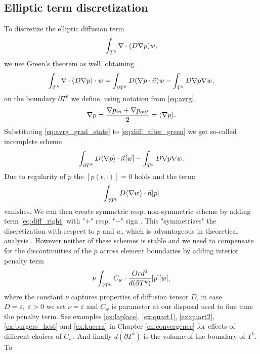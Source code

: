 \subsection{Elliptic term discretization}
\label{se:diff_term}
To discretize the elliptic diffusion term
$$
\int_{T^k}\nabla\cdot(D\nabla p) w,
$$
we use Green's theorem as well, obtaining
\begin{equation}
\label{eq:diff_after_green}
\int_{T^k}\nabla \cdot (D \nabla p)\cdot w  = \int_{\partial T^k} D(\nabla p\cdot\vec{n}) w - \int_{T^k} 
D\nabla p \nabla w,
\end{equation}
on the boundary $\partial T^k$ we define, using notation from \eqref{eq:avrg},
\begin{equation}
\nabla p = \frac{\nabla p_{in} + \nabla p_{out}}{2} = \langle\nabla p\rangle.
\label{eq:avrg_grad_state}
\end{equation}
Substituting \eqref{eq:avrg_grad_state} to \eqref{eq:diff_after_green} we get 
so-called incomplete scheme
\begin{equation}
\int_{\partial T^k} D \langle\nabla p\rangle \cdot \vec{n} [w] - \int_{T^k} D\nabla p 
\nabla w.
\end{equation}
Due to regularity of $p$ the $[p(t, \cdot)] = 0$ holds \cite[p. 14]{Kucera} and the term:
\begin{equation}
\label{eq:diff_right}
\int_{\partial T^k} D \langle\nabla w \rangle\cdot \vec{n} [p]
\end{equation}
vanishes.
We can then create symmetric resp. non-symmetric scheme by adding term 
\eqref{eq:diff_right} with "$+$" resp. "$-$" sign \cite[p. 14]{Kucera}. This 
"symmetrizes" the discretization with respect to $p$ and $w$, which is advantageous in 
theoretical analysis \cite[p. 39]{Dolejsi2015}.
However neither of these schemes is stable and we need to compensate for the 
discontinuities of the $p$ across element boundaries by adding interior penalty term 
\cite{Kucera, Antonietti2013, Dolejsi2015}
\begin{equation}
\nu \int_{\partial T^k} C_w \cdot \frac{Ord^2}{d(\partial T^k)} [p][w],
\end{equation}
where the constant $\nu$ captures properties of diffusion tensor $D$, in case $D = 
\varepsilon, \; \varepsilon > 0$ we set $\nu = \varepsilon$ and $C_w$ is 
parameter at our disposal used to fine tune the penalty term.
See examples \ref{ex:laplace}, \ref{ex:quart1}, \ref{ex:quart2}, 
\ref{ex:burgers_hest} and \ref{ex:kucera} in Chapter 
\ref{ch:convergence} for effects of different choices of $C_w$. 
And finally $d(\partial T^k)$ is the volume of the boundary of $T^k$. To 
